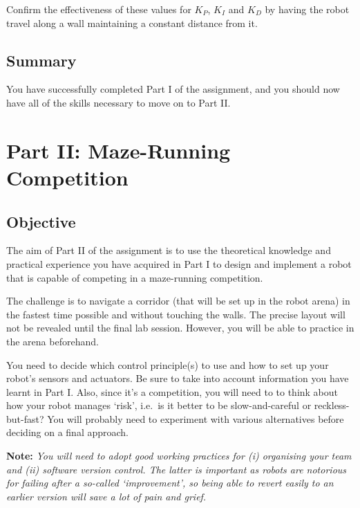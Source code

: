 \documentclass[hidelinks,a4paper,11pt]{article}
\begin{document}
	\begin{todolist}
		\item Confirm the effectiveness of these values for $K_P$, $K_I$ and $K_D$ by having the robot travel along a wall maintaining a constant distance from it.
	\end{todolist}
	
	
	\subsection{Summary}
	
	You have successfully completed Part I of the assignment, and you should now have all of the skills necessary to move on to Part II.
	
	
	\newpage
	\section{Part II: Maze-Running Competition}
	
	\subsection{Objective}
	
	The aim of Part II of the assignment is to use the theoretical knowledge and practical experience you have acquired in Part I to design and implement a robot that is capable of competing in a maze-running competition.
	
	The challenge is to navigate a corridor (that will be set up in the robot arena) in the fastest time possible and without touching the walls.  The precise layout will not be revealed until the final lab session.  However, you will be able to practice in the arena beforehand.
	
	You need to decide which control principle(s) to use and how to set up your robot's sensors and actuators.  Be sure to take into account information you have learnt in Part I.  Also, since it's a competition, you will need to to think about how your robot manages `risk', i.e.\ is it better to be slow-and-careful or reckless-but-fast?  You will probably need to experiment with various alternatives before deciding on a final approach.
	
	{\bfseries Note:}  \emph{You will need to adopt good working practices for (i) organising your team and (ii) software version control.  The latter is important as robots are notorious for failing after a so-called `improvement', so being able to revert easily to an earlier version will save a lot of pain and grief.}
	
\end{document}
